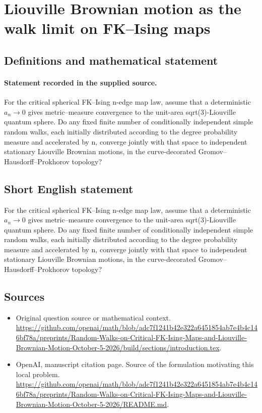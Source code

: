 \documentclass[11pt]{article}
\begin{document}
\section*{Liouville Brownian motion as the walk limit on FK–Ising maps}\label{statement}
\subsection{Definitions and mathematical statement}
\paragraph{Statement recorded in the supplied source.}
For the critical spherical FK–Ising n-edge map law, assume that a deterministic $a_n\to 0$ gives metric–measure convergence to the unit-area sqrt(3)-Liouville quantum sphere. Do any fixed finite number of conditionally independent simple random walks, each initially distributed according to the degree probability measure and accelerated by n, converge jointly with that space to independent stationary Liouville Brownian motions, in the curve-decorated Gromov–Hausdorff–Prokhorov topology?
\subsection{Short English statement}
For the critical spherical FK–Ising n-edge map law, assume that a deterministic $a_n\to 0$ gives metric–measure convergence to the unit-area sqrt(3)-Liouville quantum sphere. Do any fixed finite number of conditionally independent simple random walks, each initially distributed according to the degree probability measure and accelerated by n, converge jointly with that space to independent stationary Liouville Brownian motions, in the curve-decorated Gromov–Hausdorff–Prokhorov topology?
\subsection{Sources}
\begin{itemize}
\item[S1] Original question source or mathematical context.
\url{https://github.com/openai/math/blob/adc7f1241b42e322a6451854ab7e4b4c146bf78a/preprints/Random-Walks-on-Critical-FK-Ising-Maps-and-Liouville-Brownian-Motion-October-5-2026/build/sections/introduction.tex}.
\item[S2] OpenAI, manuscript citation page. Source of the formulation motivating this local problem.
\url{https://github.com/openai/math/blob/adc7f1241b42e322a6451854ab7e4b4c146bf78a/preprints/Random-Walks-on-Critical-FK-Ising-Maps-and-Liouville-Brownian-Motion-October-5-2026/README.md}.
\end{itemize}
\end{document}
